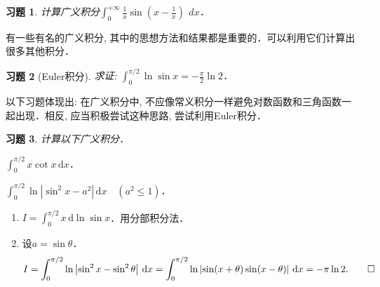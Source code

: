 \documentclass[11pt,a4paper]{ctexart}
\makeatletter
\theoremstyle{thmseries} %
\theoremstyle{exerseries}
\newtheorem{exer}{习题}[section]
\renewenvironment{proof}[1][\proofname]{\par
  \pushQED{\qed}%
  \normalfont \topsep6\p@\@plus6\p@\relax
  \trivlist
  \item[\hskip\labelsep
        \itshape
    #1\@addpunct{}]\ignorespaces
}{%
  \popQED\endtrivlist\@endpefalse
}
\newenvironment{sol}{\begin{proof}[\bfseries\upshape 解\quad]}{\end{proof}}
\newcommand{\bra}[1]{\mathopen{}\left(#1\right)}
\renewcommand{\d}{\mathrm{d}}
\makeatother
\begin{document}
\begin{exer}
	计算广义积分$\int_{0}^{+\infty}\frac{1}{x}\sin\bra{x-\frac{1}{x}}\,\ dx$．
\end{exer}

有一些有名的广义积分, 其中的思想方法和结果都是重要的．可以利用它们计算出很多其他积分．
\begin{exer}[Euler积分]
	求证: $\int_{0}^{\pi/2}\ln\sin x=-\frac{\pi}{2}\ln 2$．
\end{exer}

以下习题体现出: 在广义积分中, 不应像常义积分一样避免对数函数和三角函数一起出现．相反, 应当积极尝试这种思路, 尝试利用Euler积分．
\begin{exer}
	计算以下广义积分．
	\begin{enumerate}
	\end{enumerate}
\end{exer}
\begin{sol}
	\begin{enumerate}
		\item $I=\int_{0}^{\pi/2}x\,\d\ln\sin x$．用分部积分法．
		\item 设$a=\sin\theta$．
		\[I=\int_{0}^{\pi/2}\ln\left|\sin^2x-\sin^2\theta\right|\,\d x=\int_{0}^{\pi/2}\ln\left|\sin(x+\theta)\sin(x-\theta)\right|\,\d x=-\pi\ln 2.\qedhere\]
	\end{enumerate}
\end{sol}
\end{document}
